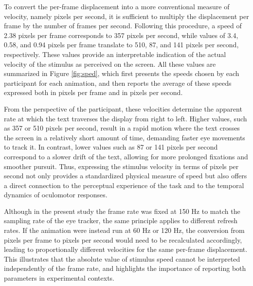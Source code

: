 \documentclass{article}
\begin{document}
To convert the per-frame displacement into a more conventional measure of velocity, namely pixels per second, it is sufficient to multiply the displacement per frame by the number of frames per second. 
Following this procedure, a speed of 2.38 pixels per frame corresponds to 357 pixels per second, while values of 3.4, 0.58, and 0.94 pixels per frame translate to 510, 87, and 141 pixels per second, respectively. 
These values provide an interpretable indication of the actual velocity of the stimulus as perceived on the screen.
All these values are summarized in Figure \ref{fig:sped}, which first presents the speeds chosen by each participant for each animation, and then reports the average of these speeds expressed both in pixels per frame and in pixels per second.

From the perspective of the participant, these velocities determine the apparent rate at which the text traverses the display from right to left. 
Higher values, such as 357 or 510 pixels per second, result in a rapid motion where the text crosses the screen in a relatively short amount of time, demanding faster eye movements to track it. 
In contrast, lower values such as 87 or 141 pixels per second correspond to a slower drift of the text, allowing for more prolonged fixations and smoother pursuit. 
Thus, expressing the stimulus velocity in terms of pixels per second not only provides a standardized physical measure of speed but also offers a direct connection to the perceptual experience of the task and to the temporal dynamics of oculomotor responses.

Although in the present study the frame rate was fixed at 150 Hz to match the sampling rate of the eye tracker, the same principle applies to different refresh rates. 
If the animation were instead run at 60 Hz or 120 Hz, the conversion from pixels per frame to pixels per second would need to be recalculated accordingly, leading to proportionally different velocities for the same per-frame displacement. 
This illustrates that the absolute value of stimulus speed cannot be interpreted independently of the frame rate, and highlights the importance of reporting both parameters in experimental contexts.
\end{document}
